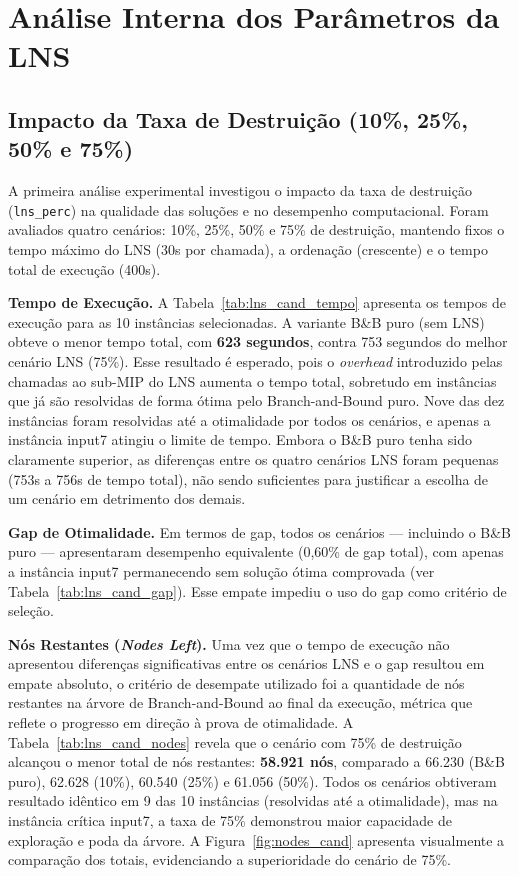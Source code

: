 \section{Análise Interna dos Parâmetros da LNS} \label{sec:analise_interna}

\subsection{Impacto da Taxa de Destruição (10\%, 25\%, 50\% e 75\%)}

A primeira análise experimental investigou o impacto da taxa de destruição (\texttt{lns\_perc}) na qualidade das soluções e no desempenho computacional. Foram avaliados quatro cenários: 10\%, 25\%, 50\% e 75\% de destruição, mantendo fixos o tempo máximo do LNS (30s por chamada), a ordenação (crescente) e o tempo total de execução (400s).

\textbf{Tempo de Execução.} A Tabela~\ref{tab:lns_cand_tempo} apresenta os tempos de execução para as 10 instâncias selecionadas. A variante B\&B puro (sem LNS) obteve o menor tempo total, com \textbf{623 segundos}, contra 753 segundos do melhor cenário LNS (75\%). Esse resultado é esperado, pois o \emph{overhead} introduzido pelas chamadas ao sub-MIP do LNS aumenta o tempo total, sobretudo em instâncias que já são resolvidas de forma ótima pelo Branch-and-Bound puro. Nove das dez instâncias foram resolvidas até a otimalidade por todos os cenários, e apenas a instância input7 atingiu o limite de tempo. Embora o B\&B puro tenha sido claramente superior, as diferenças entre os quatro cenários LNS foram pequenas (753s a 756s de tempo total), não sendo suficientes para justificar a escolha de um cenário em detrimento dos demais.



\textbf{Gap de Otimalidade.} Em termos de gap, todos os cenários --- incluindo o B\&B puro --- apresentaram desempenho equivalente (0,60\% de gap total), com apenas a instância input7 permanecendo sem solução ótima comprovada (ver Tabela~\ref{tab:lns_cand_gap}). Esse empate impediu o uso do gap como critério de seleção.



\textbf{Nós Restantes (\emph{Nodes Left}).} Uma vez que o tempo de execução não apresentou diferenças significativas entre os cenários LNS e o gap resultou em empate absoluto, o critério de desempate utilizado foi a quantidade de nós restantes na árvore de Branch-and-Bound ao final da execução, métrica que reflete o progresso em direção à prova de otimalidade. A Tabela~\ref{tab:lns_cand_nodes} revela que o cenário com 75\% de destruição alcançou o menor total de nós restantes: \textbf{58.921 nós}, comparado a 66.230 (B\&B puro), 62.628 (10\%), 60.540 (25\%) e 61.056 (50\%). Todos os cenários obtiveram resultado idêntico em 9 das 10 instâncias (resolvidas até a otimalidade), mas na instância crítica input7, a taxa de 75\% demonstrou maior capacidade de exploração e poda da árvore. A Figura~\ref{fig:nodes_cand} apresenta visualmente a comparação dos totais, evidenciando a superioridade do cenário de 75\%.

